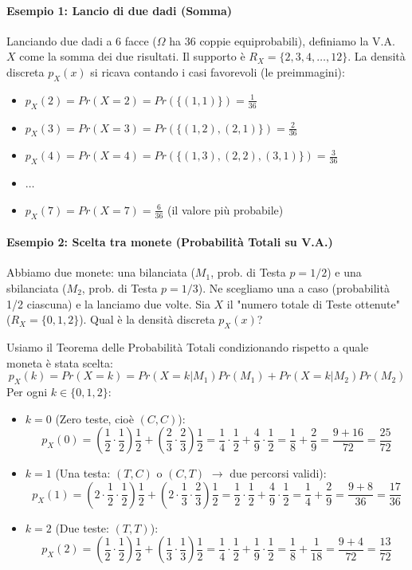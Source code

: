 \documentclass[12pt, a4paper]{article}
\begin{document}
\paragraph{Esempio 1: Lancio di due dadi (Somma)}
Lanciando due dadi a 6 facce ($\Omega$ ha 36 coppie equiprobabili), definiamo la V.A. $X$ come la somma dei due risultati. Il supporto è $R_X = \{2, 3, 4, \dots, 12\}$.
La densità discreta $p_X(x)$ si ricava contando i casi favorevoli (le preimmagini):
\begin{itemize}
    \item $p_X(2) = Pr(X=2) = Pr(\{(1,1)\}) = \frac{1}{36}$
    \item $p_X(3) = Pr(X=3) = Pr(\{(1,2), (2,1)\}) = \frac{2}{36}$
    \item $p_X(4) = Pr(X=4) = Pr(\{(1,3), (2,2), (3,1)\}) = \frac{3}{36}$
    \item $\dots$
    \item $p_X(7) = Pr(X=7) = \frac{6}{36}$ (il valore più probabile)
\end{itemize}

\paragraph{Esempio 2: Scelta tra monete (Probabilità Totali su V.A.)}
Abbiamo due monete: una bilanciata ($M_1$, prob. di Testa $p=1/2$) e una sbilanciata ($M_2$, prob. di Testa $p=1/3$). Ne scegliamo una a caso (probabilità 1/2 ciascuna) e la lanciamo due volte.
Sia $X$ il "numero totale di Teste ottenute" ($R_X = \{0, 1, 2\}$). Qual è la densità discreta $p_X(x)$?

Usiamo il Teorema delle Probabilità Totali condizionando rispetto a quale moneta è stata scelta:
$$ p_X(k) = Pr(X = k) = Pr(X = k | M_1) Pr(M_1) + Pr(X = k | M_2) Pr(M_2) $$
Per ogni $k \in \{0, 1, 2\}$:
\begin{itemize}
    \item $k=0$ (Zero teste, cioè $(C,C)$):
    $$ p_X(0) = \left(\frac{1}{2} \cdot \frac{1}{2}\right) \frac{1}{2} + \left(\frac{2}{3} \cdot \frac{2}{3}\right) \frac{1}{2} = \frac{1}{4} \cdot \frac{1}{2} + \frac{4}{9} \cdot \frac{1}{2} = \frac{1}{8} + \frac{2}{9} = \frac{9 + 16}{72} = \frac{25}{72} $$
    \item $k=1$ (Una testa: $(T,C)$ o $(C,T)$ $\rightarrow$ due percorsi validi):
    $$ p_X(1) = \left(2 \cdot \frac{1}{2} \cdot \frac{1}{2}\right) \frac{1}{2} + \left(2 \cdot \frac{1}{3} \cdot \frac{2}{3}\right) \frac{1}{2} = \frac{1}{2} \cdot \frac{1}{2} + \frac{4}{9} \cdot \frac{1}{2} = \frac{1}{4} + \frac{2}{9} = \frac{9 + 8}{36} = \frac{17}{36} $$
    \item $k=2$ (Due teste: $(T,T)$):
    $$ p_X(2) = \left(\frac{1}{2} \cdot \frac{1}{2}\right) \frac{1}{2} + \left(\frac{1}{3} \cdot \frac{1}{3}\right) \frac{1}{2} = \frac{1}{4} \cdot \frac{1}{2} + \frac{1}{9} \cdot \frac{1}{2} = \frac{1}{8} + \frac{1}{18} = \frac{9 + 4}{72} = \frac{13}{72} $$
\end{itemize}
\end{document}
